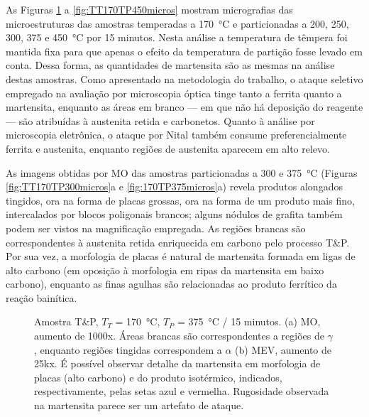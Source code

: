 
As Figuras \ref{fig:TT170TP375micros} a \ref{fig:TT170TP450micros} mostram micrografias das microestruturas das amostras temperadas a \SI{170}{\degreeCelsius} e particionadas a 200, 250, 300, 375 e \SI{450}{\degreeCelsius} por 15 minutos. Nesta análise a temperatura de têmpera foi mantida fixa para que apenas o efeito da temperatura de partição fosse levado em conta. Dessa forma, as quantidades de martensita são as mesmas na análise destas amostras. Como apresentado na metodologia do trabalho, o ataque seletivo empregado na avaliação por microscopia óptica tinge tanto a ferrita quanto a martensita, enquanto as áreas em branco --- em que não há deposição do reagente --- são atribuídas à austenita retida e carbonetos. Quanto à análise por microscopia eletrônica, o ataque por Nital também consume preferencialmente ferrita e austenita, enquanto regiões de austenita aparecem em alto relevo. 

As imagens obtidas por MO das amostras particionadas a 300 e \SI{375}{\degreeCelsius} (Figuras \ref{fig:TT170TP300micros}a e \ref{fig:170TP375micros}a) revela produtos alongados tingidos, ora na forma de placas grossas, ora na forma de um produto mais fino, intercalados por blocos poligonais brancos; alguns nódulos de grafita também podem ser vistos na magnificação empregada. As regiões brancas são correspondentes à austenita retida enriquecida em carbono pelo processo T\&P. Por sua vez, a morfologia de placas é natural de martensita formada em ligas de alto carbono (em oposição à morfologia em ripas da martensita em baixo carbono), enquanto as finas agulhas são relacionadas ao produto ferrítico da reação bainítica.

\begin{figure}
  \centering
  \quad
  \caption{Amostra T\&P, $T_T$ = \SI{170}{\degreeCelsius}, $T_P$ = \SI{375}{\degreeCelsius} / 15 minutos. (a) MO, aumento de 1000x. Áreas brancas são correspondentes a regiões de $\gamma$, enquanto regiões tingidas correspondem a $\alpha$ (b) MEV, aumento de 25kx. É possível observar detalhe da martensita em morfologia de placas (alto carbono) e do produto isotérmico, indicados, respectivamente, pelas setas azul e vermelha. Rugosidade observada na martensita parece ser um artefato de ataque.}
  \label{fig:TT170TP375micros}
\end{figure}


